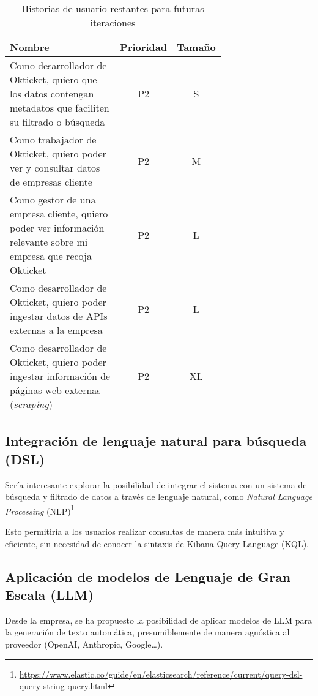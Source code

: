 \begin{table}[H]
	\centering
	\begin{tabular}{|p{0.7\linewidth}|c|c|}
		\hline
		\textbf{Nombre} & \textbf{Prioridad} & \textbf{Tamaño} \\
		\hline
		\hline
		Como desarrollador de Okticket, quiero que los datos contengan metadatos que faciliten su filtrado o búsqueda & P2\cellcolor{yellow!50} & S\cellcolor{green!25} \\
		\hline
		Como trabajador de Okticket, quiero poder ver y consultar datos de empresas cliente & P2\cellcolor{yellow!50} & M\cellcolor{yellow!50} \\
		\hline
		Como gestor de una empresa cliente, quiero poder ver información relevante sobre mi empresa que recoja Okticket & P2\cellcolor{yellow!50} & L\cellcolor{orange!50} \\
		\hline
		Como desarrollador de Okticket, quiero poder ingestar datos de APIs externas a la empresa & P2\cellcolor{yellow!50} & L\cellcolor{orange!50} \\
		\hline
		Como desarrollador de Okticket, quiero poder ingestar información de páginas web externas (\textit{scraping}) & P2\cellcolor{yellow!50} & XL\cellcolor{red!50} \\
		\hline
	\end{tabular}
	\caption{Historias de usuario restantes para futuras iteraciones}
	\label{tab:remaining_tasks}
\end{table}


\newpage{}
\subsection{Integración de lenguaje natural para búsqueda (DSL)}
Sería interesante explorar la posibilidad de integrar el sistema con
un sistema de búsqueda y filtrado de datos a través de lenguaje natural, como
\textit{Natural Language Processing} (NLP)\footnote{
	\url{https://www.elastic.co/guide/en/elasticsearch/reference/current/query-dsl-query-string-query.html}
}

Esto permitiría a los usuarios realizar consultas de manera más intuitiva y
eficiente, sin necesidad de conocer la sintaxis de Kibana Query Language (KQL).


\subsection{Aplicación de modelos de Lenguaje de Gran Escala (LLM)}
Desde la empresa, se ha propuesto la posibilidad de aplicar modelos de LLM
para la generación de texto automática, presumiblemente de manera agnóstica al
proveedor (OpenAI, Anthropic, Google\ldots).

